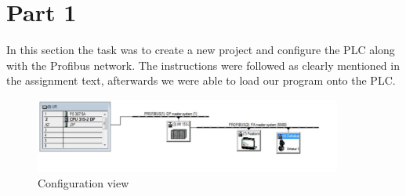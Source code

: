 \section{Part 1}

In this section the task was to create a new project and configure the PLC along with the Profibus network. The instructions were followed as clearly mentioned in the assignment text, afterwards we were able to load our program onto the PLC.

\begin{figure}[!htb]
    \centering
    \includegraphics[width=0.9\textwidth]{images/bilde1}
    \caption{Configuration view}
\end{figure}